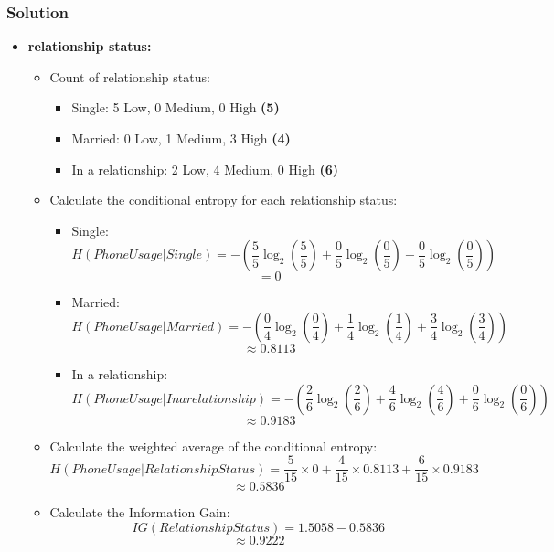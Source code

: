 \documentclass{article}
\begin{document}
\begin{enumerate}[label=\alph*)]
   \subsubsection*{Solution}
   \begin{itemize}
      \item \textbf{relationship status:}
      \begin{itemize}
         \item Count of relationship status:
         \begin{itemize}
            \item Single: 5 Low, 0 Medium, 0 High \textbf{(5)}
            \item Married: 0 Low, 1 Medium, 3 High \textbf{(4)}
            \item In a relationship: 2 Low, 4 Medium,  0 High \textbf{(6)}
         \end{itemize}
         \item Calculate the conditional entropy for each relationship status:
         \begin{itemize}
            \item Single:
            \[
            H(Phone Usage | Single) = -(\frac{5}{5} \log_2(\frac{5}{5}) + \frac{0}{5} \log_2(\frac{0}{5}) + \frac{0}{5} \log_2(\frac{0}{5}))
            \]
            \[
            = 0
            \]
            \item Married:
            \[
            H(Phone Usage | Married) = -(\frac{0}{4} \log_2(\frac{0}{4}) + \frac{1}{4} \log_2(\frac{1}{4}) + \frac{3}{4} \log_2(\frac{3}{4}))
            \]
            \[
            \approx 0.8113
            \]
            \item In a relationship:
            \[
            H(Phone Usage | In a relationship) = -(\frac{2}{6} \log_2(\frac{2}{6}) + \frac{4}{6} \log_2(\frac{4}{6}) + \frac{0}{6} \log_2(\frac{0}{6}))
            \]
            \[
            \approx 0.9183
            \]
      \end{itemize}
      \item Calculate the weighted average of the conditional entropy:
      \[
      H(Phone Usage | Relationship Status) = \frac{5}{15} \times 0 + \frac{4}{15} \times 0.8113 + \frac{6}{15} \times 0.9183
      \]
      \[
      \approx 0.5836
      \]

      \item Calculate the Information Gain:
      \[
      IG(Relationship Status) = 1.5058 - 0.5836
      \]
      \[
      \approx 0.9222
      \]
\end{itemize}


\end{itemize}
\end{enumerate}
\end{document}
